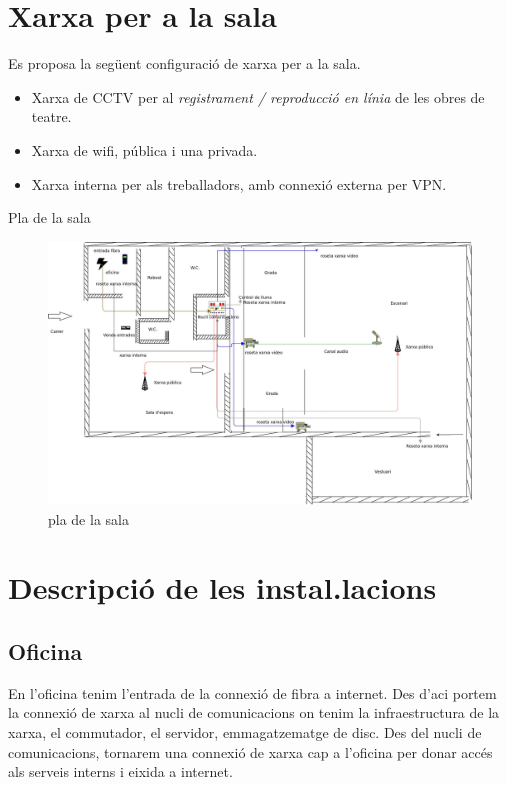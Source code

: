 \documentclass[
  10pt,
]{krantz}
\providecommand{\tightlist}{%
  \setlength{\itemsep}{0pt}\setlength{\parskip}{0pt}}
\begin{document}
\hypertarget{xarxa-per-a-la-sala}{%
\section{Xarxa per a la sala}\label{xarxa-per-a-la-sala}}

Es proposa la següent configuració de xarxa per a la sala.

\begin{itemize}
\tightlist
\item
  Xarxa de CCTV per al \emph{registrament / reproducció en línia} de les obres de teatre.
\item
  Xarxa de wifi, pública i una privada.
\item
  Xarxa interna per als treballadors, amb connexió externa per VPN.
\end{itemize}

Pla de la sala

\begin{figure}
\centering
\includegraphics{imatges/teatre.jpeg}
\caption{pla de la sala}
\end{figure}

\hypertarget{descripciuxf3-de-les-instal.lacions}{%
\section{Descripció de les instal.lacions}\label{descripciuxf3-de-les-instal.lacions}}

\hypertarget{oficina}{%
\subsection{Oficina}\label{oficina}}

En l'oficina tenim l'entrada de la connexió de fibra a internet. Des d'aci portem la connexió de xarxa al nucli de comunicacions on tenim la infraestructura de la xarxa, el commutador, el servidor, emmagatzematge de disc. Des del nucli de comunicacions, tornarem una connexió de xarxa cap a l'oficina per donar accés als serveis interns i eixida a internet.
\end{document}
